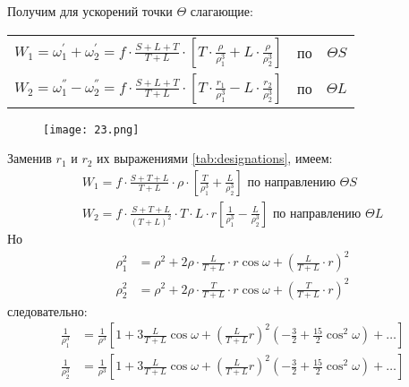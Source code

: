 \documentclass[a4paper,12pt]{article}
\begin{document}
    Получим для ускорений точки $\Theta$ слагающие:
    \begin{center}
        \begin{tabular}{ccc}
            $\displaystyle W_1 = \omega_1^{'} + \omega_2^{'} = f \cdot \frac{S + L + T}{T + L} \cdot \left[T \cdot \frac{\rho}{\rho_1^3} + L \cdot \frac{\rho}{\rho_2^3} \right] $ & по & $\Theta S$ \\[2ex]
            $\displaystyle W_2 = \omega_1^{''} - \omega_2^{''} = f \cdot \frac{S + L + T}{T + L} \cdot \left[T \cdot \frac{r_1}{\rho_1^3} - L \cdot \frac{r_2}{\rho_2^3} \right] $ & по & $\Theta L$ \\
        \end{tabular}
    \end{center}
    \begin{figure}[h]
        \centering
        \texttt{[image: 23.png]}
        \caption{}\label{fig:fig23}
    \end{figure}

    Заменив $r_1$ и $r_2$ их выражениями \eqref{tab:designations}, имеем:
    \begin{equation*}
        \begin{aligned}
            W_1 = f \cdot \frac{S + T + L}{T + L} \cdot \rho \cdot \left[\frac{T}{\rho_1^3} + \frac{L}{\rho_2^3} \right] \text{ по направлению } \Theta S \\
            W_2 = f \cdot \frac{S + T + L}{\left(T + L\right)^2} \cdot T \cdot L \cdot r \left[\frac{1}{\rho_1^3} - \frac{L}{\rho_2^3} \right] \text{ по направлению } \Theta L
        \end{aligned}
    \end{equation*}
    Но
    \begin{equation*}
        \begin{aligned}
            \rho_1^2 &= \rho^2 + 2\rho \cdot \frac{L}{T + L} \cdot r \cos{\omega} + \left(\frac{L}{T + L} \cdot r \right)^2 \\
            \rho_2^2 &= \rho^2 + 2\rho \cdot \frac{T}{T + L} \cdot r \cos{\omega} + \left(\frac{T}{T + L} \cdot r \right)^2
        \end{aligned}
    \end{equation*}
    следовательно:
    \begin{equation*}
       \begin{aligned}
            \frac{1}{\rho_1^3} &= \frac{1}{\rho^3} \left[1 + 3 \frac{L}{T + L}\cos{\omega} + \left(\frac{L}{T + L} r \right)^2 \left(- \frac{3}{2} + \frac{15}{2} \cos^2{\omega} \right) + \dots \right] \\
            \frac{1}{\rho_2^3} &= \frac{1}{\rho^3} \left[1 + 3 \frac{L}{T + L}\cos{\omega} + \left(\frac{L}{T + L} r \right)^2 \left(- \frac{3}{2} + \frac{15}{2} \cos^2{\omega} \right) + \dots \right]
        \end{aligned}
    \end{equation*}
\end{document}
